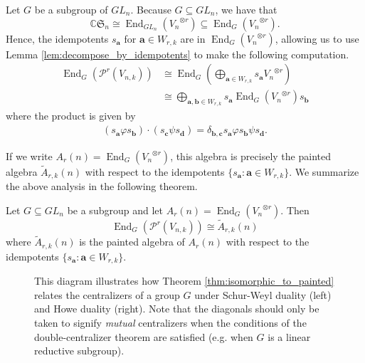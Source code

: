 \documentclass[ALCO,Unicode,published]{cedram}
\newcommand{\C}{\mathbb{C}}
\newcommand{\PP}{\mathcal{P}}
\newcommand{\SG}{\mathfrak{S}}
\newcommand{\bfa}{{\boldsymbol{a}}}
\newcommand{\bfb}{{\boldsymbol{b}}}
\newcommand{\bfc}{{\boldsymbol{c}}}
\newcommand{\bfd}{{\boldsymbol{d}}}
\DeclareMathOperator{\End}{End}
\begin{document}
Let $G$ be a subgroup of $GL_n$. Because $G\subseteq GL_n$, we have that\[\C\SG_n\cong\End_{GL_n}({V_n}^{\otimes r})\subseteq \End_G({V_n}^{\otimes r}).\] Hence, the idempotents $s_\bfa$ for $\bfa\in W_{r,k}$ are in $\End_G({V_n}^{\otimes r})$, allowing us to use Lemma \ref{lem:decompose_by_idempotents} to make the following computation. \begin{align*}
    \End_G\left(\PP^r(V_{n,k})\right)&\cong\End_G\left(\bigoplus_{\bfa\in W_{r,k}}s_\bfa {V_n}^{\otimes r}\right)\\
    &\cong\bigoplus_{\bfa,\bfb\in W_{r,k}}s_\bfa\End_G({V_n}^{\otimes r})s_\bfb
\end{align*} where the product is given by \begin{align}
    (s_\bfa\varphi s_\bfb)\cdot(s_\bfc\psi s_\bfd)=\delta_{\bfb,\bfc}s_\bfa\varphi s_\bfb \psi s_\bfd.
\end{align}

If we write $A_r(n)=\End_G({V_n}^{\otimes r})$, this algebra is precisely the painted algebra $\tilde{A}_{r,k}(n)$ with respect to the idempotents $\{s_\bfa:\bfa\in W_{r,k}\}$. We summarize the above analysis in the following theorem.

\begin{theorem}\label{thm:isomorphic_to_painted} Let $G\subseteq GL_n$ be a subgroup and let $A_r(n)=\End_G\left({V_n}^{\otimes r}\right)$. Then\[\End_G\left(\PP^r(V_{n,k})\right)\cong \tilde{A}_{r,k}(n)\] where $\tilde{A}_{r,k}(n)$ is the painted algebra of $A_r(n)$ with respect to the idempotents $\{s_\bfa:\bfa\in W_{r,k}\}$.
\end{theorem}

\begin{figure}[ht]
    \centering
    \caption{This diagram illustrates how Theorem \ref{thm:isomorphic_to_painted} relates the centralizers of a group $G$ under Schur-Weyl duality (left) and Howe duality (right). Note that the diagonals should only be taken to signify \textit{mutual} centralizers when the conditions of the double-centralizer theorem are satisfied (e.g. when $G$ is a linear reductive subgroup).}
    \label{fig:seesaw}
\end{figure}
\end{document}
